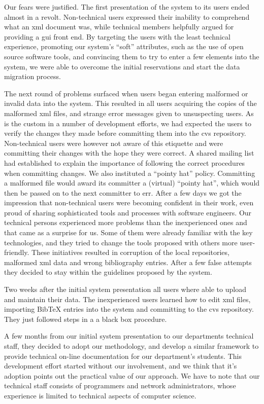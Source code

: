 \documentclass{elsart}
\begin{document}
Our fears were justified.
The first presentation of the system to its users ended
almost in a revolt.
Non-technical users expressed their inability to comprehend
what an {\sc xml} document was, while technical members
helpfully argued for providing a {\sc gui} front end.
By targeting the users with the least technical experience,
promoting our system's ``soft'' attributes,
such as the use of open source software tools,
and convincing them to try to enter a few elements into
the system, we were able to overcome the initial reservations
and start the data migration process.

The next round of problems surfaced when users began entering
malformed or invalid data into the system.
This resulted in all users acquiring the copies of the malformed
{\sc xml} files, and strange error messages given to unsuspecting
users.
As is the custom in a number of development efforts, we had
expected the users to verify the changes they made before
committing them into the {\sc cvs} repository.
Non-technical users were however not aware of this etiquette
and were committing their changes with the hope they were correct.
A shared mailing list had established to explain the
importance of following the correct procedures when committing changes.
We also instituted a ``pointy hat'' policy. Committing a malformed file would award 
its committer a (virtual) ``pointy hat'', which would then be passed on to the next committer to err.
After a few days we got the impression that non-technical users
were becoming confident in their work, even proud of sharing
sophisticated tools and processes with software engineers.
Our technical persons experienced more problems than the inexperienced ones 
and that came as a surprise for us. Some of them were already familiar 
with the key technologies, and they tried to change the tools proposed with others 
more user-friendly. 
These initiatives resulted in corruption of the local repositories, malformed 
{\sc xml} data and wrong bibliography entries.
After a few false attempts they decided to stay within the guidelines proposed by the system.

Two weeks after the initial system presentation all users where able to upload 
and maintain their data. The inexperienced users learned how to edit {\sc xml} files,
importing {\sc BibTeX} entries into the system and committing to the {\sc cvs} repository. 
They just followed steps in a a black box procedure.

A few months from our initial system presentation to our departments technical staff, they decided to adopt our 
methodology, and develop a similar framework to provide technical on-line documentation for our department's students. This development effort started without our involvement, and we think that it's adoption points out the practical value of our approach. We have to note that our technical staff consists of programmers and network administrators, whose experience is limited to technical aspects of computer science.
\end{document}
